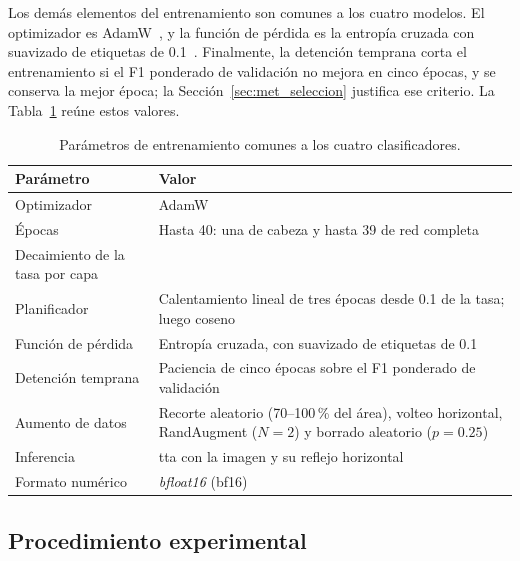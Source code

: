 Los demás elementos del entrenamiento son comunes a los cuatro modelos. El optimizador es
AdamW~\cite{loshchilov2019decoupled}, y la función de pérdida es la entropía cruzada con suavizado de etiquetas de
0.1~\cite{szegedy2016rethinking,muller2019does}. Finalmente, la detención temprana corta el entrenamiento si el F1
ponderado de validación no mejora en cinco épocas, y se conserva la mejor época; la
Sección~\ref{sec:met_seleccion} justifica ese criterio. La Tabla~\ref{tab:met_receta} reúne estos valores.

\begin{table}[H]
    \centering
    \caption{Parámetros de entrenamiento comunes a los cuatro clasificadores.}
    \label{tab:met_receta}
    \small
    \begin{tabularx}{\textwidth}{@{}>{\raggedright\arraybackslash}p{4.2cm}>{\raggedright\arraybackslash}X@{}}
        \toprule
        \textbf{Parámetro} & \textbf{Valor} \\
        \midrule
        Optimizador & AdamW \\
        \filasep
        Épocas & Hasta 40: una de cabeza y hasta 39 de red completa \\
        \filasep
        Decaimiento de la tasa por capa & 0.85 \\
        \filasep
        Planificador & Calentamiento lineal de tres épocas desde 0.1 de la tasa; luego coseno \\
        \filasep
        Función de pérdida & Entropía cruzada, con suavizado de etiquetas de 0.1 \\
        \filasep
        Detención temprana & Paciencia de cinco épocas sobre el F1 ponderado de validación \\
        \filasep
        Aumento de datos & Recorte aleatorio (70--100\,\% del área), volteo horizontal, RandAugment ($N = 2$) y borrado aleatorio ($p = 0.25$) \\
        \filasep
        Inferencia & \gls{tta} con la imagen y su reflejo horizontal \\
        \filasep
        Formato numérico & \emph{bfloat16} (bf16) \\
        \bottomrule
    \end{tabularx}
\end{table}

\subsection{Procedimiento experimental}
\label{sec:met_supervisados_ensamble}

